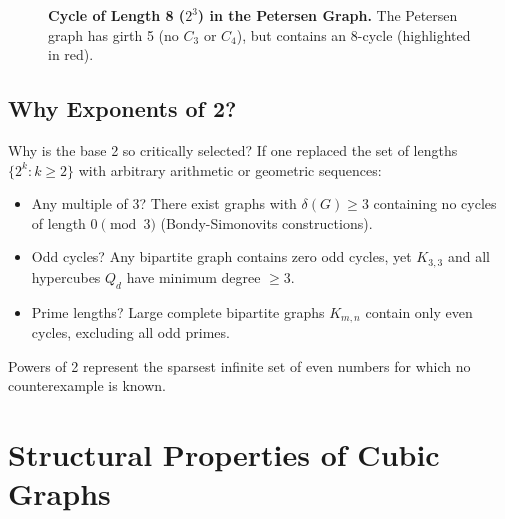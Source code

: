 \documentclass[11pt,a4paper]{article}
\theoremstyle{definition}
\begin{document}
\begin{figure}[htbp]
\centering
{}
\caption{\textbf{Cycle of Length 8 ($2^3$) in the Petersen Graph.} The Petersen graph has girth 5 (no $C_3$ or $C_4$), but contains an 8-cycle (highlighted in red).}
\label{fig:petersen_8_cycle}
\end{figure}

\subsection{Why Exponents of 2?}
Why is the base 2 so critically selected? If one replaced the set of lengths $\{2^k : k \ge 2\}$ with arbitrary arithmetic or geometric sequences:
\begin{itemize}
    \item Any multiple of 3? There exist graphs with $\delta(G) \ge 3$ containing no cycles of length $0 \pmod 3$ (Bondy-Simonovits constructions).
    \item Odd cycles? Any bipartite graph contains zero odd cycles, yet $K_{3, 3}$ and all hypercubes $Q_d$ have minimum degree $\ge 3$.
    \item Prime lengths? Large complete bipartite graphs $K_{m, n}$ contain only even cycles, excluding all odd primes.
\end{itemize}
Powers of 2 represent the sparsest infinite set of even numbers for which no counterexample is known.

\section{Structural Properties of Cubic Graphs}
\end{document}
